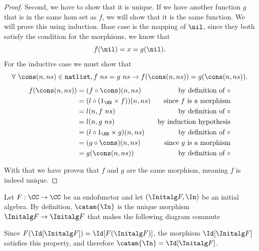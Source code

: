 \begin{solution}
\begin{proof}
			Second, we have to show that it is unique.
			If we have another function $g$ that is in the same hom set as $f$, we will show that it is the same function.
			We will prove this using induction.
			Base case is the mapping of $\nil$, since they both satisfy the condition for the morphisms, we know that
			\[
				f ( \nil ) = x = g ( \nil ).
			\]
			For the inductive case we must show that
			\[
				\forall\ \cons (n, ns) \in \texttt{natlist},
				f\ ns = g\ ns \to f (\cons (n, ns)) = g (\cons (n, ns)).
			\]
			\begin{align*}
				f (\cons (n, ns)) & = (f \circ \cons) (n, ns)           & \text{by definition of $\circ$} \\
				                          & = (l \circ (1_\NN \times f)) (n, ns) & \text{since $f$ is a morphism}  \\
				                          & = l (n, f\ ns)                              & \text{by definition of $\circ$} \\
				                          & = l (n, g\ ns)                              & \text{by induction hypothesis}  \\
				                          & = (l \circ 1_\NN \times g) (n, ns)   & \text{by definition of $\circ$} \\
				                          & = (g \circ \cons) (n, ns)           & \text{since $g$ is a morphism}  \\
				                          & = g (\cons (n, ns))                 & \text{by definition of $\circ$}
			\end{align*}

      With that we have proven that $f$ and $g$ are the same morphism, meaning $f$ is indeed unique.
		\end{proof}
\end{solution}

\begin{solution}\label{sol:in_catamorphism_id}
	Let $ F: \CC \to \CC $ be an endofunctor and let $ (\Initalg F, \In) $ be an initial algebra. By definition, $ \catam{\In} $ is the unique morphism $ \Initalg F \to \Initalg F $ that makes the following diagram commute
	\begin{center}
	\end{center}
	Since $ F(\Id[\Initalg F]) = \Id[F(\Initalg F)] $, the morphism $ \Id[\Initalg F] $ satisfies this property, and therefore $ \catam{\In} = \Id[\Initalg F] $.
\end{solution}

